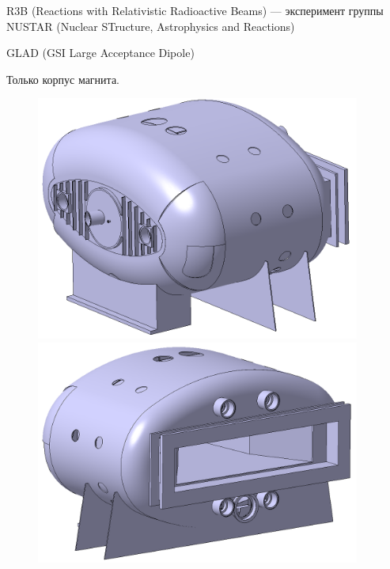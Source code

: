 R3B (Reactions with Relativistic Radioactive Beams) --- эксперимент группы NUSTAR (Nuclear STructure, Astrophysics and Reactions)

GLAD (GSI Large Acceptance Dipole)

Только корпус магнита.

\begin{figure}[H]
\begin{minipage}[b]{0.495\textwidth}
\includegraphics[width=0.95\textwidth]{pictures/GLAD1.png}
\caption{}
\label{fig:GLAD1}
\end{minipage}
\hspace{0.01\textwidth}
\begin{minipage}[b]{0.495\textwidth}
\includegraphics[width=0.95\textwidth]{pictures/GLAD2.png}
\caption{}
\label{fig:GLAD2}
\end{minipage}


\end{figure}
